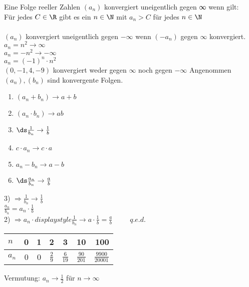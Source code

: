 %
\setcounter{chapter}{3}
\setcounter{section}{9}
%
\wdh
Eine Folge reeller Zahlen $(a_n)$ konvergiert uneigentlich gegen ∞ wenn gilt:\\
Für jedes $C \in \R$ gibt es ein $n \in\N$ mit $a_n > C$ für jedes $n \in\N$\\
\\
$(a_n)$ konvergiert uneigentlich gegen $- \infty$ wenn $(-a_n)$ gegen $\infty$ konvergiert.\\
%
%
\bsp
$a_n = n^2 \to \infty$\\
$a_n = -n^2 \to -\infty$\\
$a_n = (-1)^n \cdot n^2$\\
$(0, -1, 4, -9)$ konvergiert weder gegen $\infty$ noch gegen $ - \infty$
%
Angenommen $(a_n), (b_n)$ sind konvergente Folgen.\\
\begin{enumerate}
\item{$(a_n + b_n) \to a + b$}
\item{$(a_n \cdot b_n) \to ab$}
\item{$\ds\frac{1}{b_n} \to \frac{1}{b}$}
\item{$c \cdot a_n \to c \cdot a$}
\item{$a_n - b_n \to a - b$}
\item{$\ds\frac{a_n}{b_n} \to \frac{a}{b}$}
\end{enumerate}
%
3) $\Rightarrow \displaystyle\frac{1}{b_n} \to \displaystyle\frac{1}{b}$\\
$\displaystyle\frac{a_n}{b_n} = a_n \cdot \displaystyle\frac{1}{b}$\\
2) $\Rightarrow a_n \cdot displaystyle\frac{1}{b_n} \to a \cdot \displaystyle\frac{1}{b} = \displaystyle\frac{a}{b} \phantom{XXX} q.e.d.$\\
%
\bsp
\begin{tabular}{l|c|c|c|c|c|r}
$n$   & 0 & 1 & 2 & 3 & 10 & 100\\\hline
$a_n$ & 0 & 0 & $\frac{2}{9}$ & $\frac{6}{19}$ & $\frac{90}{201}$ & $\frac{9900}{20001}$ \\
\end{tabular}
\vspace{5mm}
Vermutung: $a_n \to \displaystyle\frac{1}{2}$ für $n \to \infty$\\
